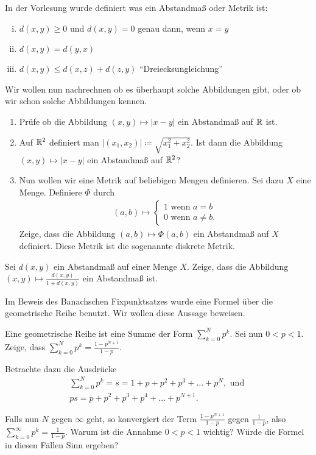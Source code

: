 \documentclass[a4paper,10pt]{article}
\begin{document}
\begin{Aufg}
 In der Vorlesung wurde definiert was ein Abstandmaß oder Metrik ist:
 \begin{enumerate}[(i)]
  \item $d(x, y) \geq 0 $ und $d(x,y) =0$ genau dann, wenn $x=y$
  \item $d(x,y) = d(y,x)$
  \item $d(x,y) \leq d(x,z) + d(z,y)$ ``Dreiecksungleichung''
 \end{enumerate}
 
 Wir wollen nun nachrechnen ob es überhaupt solche Abbildungen gibt,
 oder ob wir schon solche Abbildungen kennen. 
 \begin{enumerate}
  \item Prüfe ob die Abbildung $(x,y) \mapsto |x-y|$ ein Abstandmaß auf $\mathbb{R}$ ist.
  \item Auf $\mathbb{R}^2$ definiert man $|(x_1, x_2)| \coloneqq \sqrt{x_1 ^2 + x_2 ^2}$.
	Ist dann die Abbildung $(x,y) \mapsto |x-y|$ ein Abstandmaß auf $\mathbb{R}^2$?
  \item Nun wollen wir eine Metrik auf beliebigen Mengen definieren. Sei dazu $X$
	eine Menge. Definiere $\Phi$ durch
  \begin{gather*}
   (a,b)\mapsto \begin{cases}
            1  \text{ wenn } a=b \\
            0  \text{ wenn } a\neq b.
            \end{cases}
  \end{gather*}
 Zeige, dass die Abbildung $(a,b) \mapsto \Phi(a,b)$ ein Abstandmaß auf $X$ definiert. 
 Diese Metrik ist die sogenannte diskrete Metrik.
  
 \end{enumerate}

\end{Aufg}
 
\begin{Aufg}
Sei $d(x,y)$ ein Abstandmaß auf einer Menge $X$. Zeige, dass die Abbildung
 $(x,y) \mapsto \frac{d(x,y)}{1 + d(x,y)}$ ein Abstandmaß ist.
\end{Aufg}


\begin{Aufg}
Im Beweis des Banachschen Fixpunktsatzes wurde eine Formel über die geometrische Reihe
benutzt. Wir wollen diese Aussage beweisen.

Eine geometrische Reihe ist eine Summe der Form $\sum_{k=0}^N p^k$. Sei nun \linebreak $0<p<1$.
Zeige, dass $\sum_{k=0}^N p^k=  \frac{1- p^{N+1}}{1 - p}$.

Betrachte dazu die Ausdrücke 
\begin{gather*}
 \sum_{k=0}^N p^k= s = 1 + p + p^2 + p^3 + \dots + p^N, \text{ und }\\
 ps =p +p^2 +p^3 + p^4 + \dots + p^{N+1}.
\end{gather*}

Falls nun $N$ gegen $\infty$ geht, so konvergiert der Term $\frac{1- p^{N+1}}{1 - p}$
gegen $\frac{1}{1 - p}$, also $\sum_{k=0}^\infty p^k=  \frac{1}{1 - p}$.
Warum ist die Annahme $0<p<1$ wichtig? Würde die Formel in diesen Fällen Sinn ergeben?
\end{Aufg}
\end{document}
